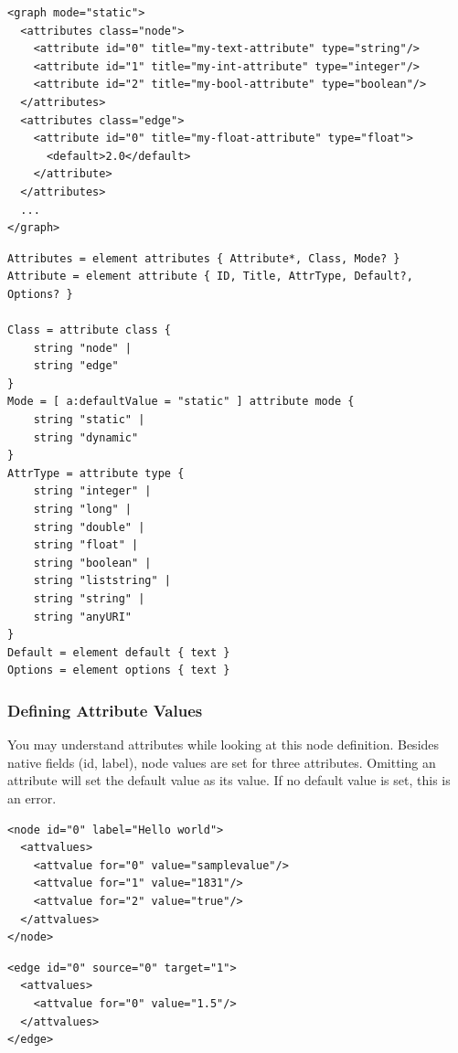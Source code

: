 \documentclass[a4paper,10pt]{article}
\begin{document}
\lstset{ style=gexf }
\begin{lstlisting}[caption={Attributes Definition},label=attributesDef]
<graph mode="static">
  <attributes class="node">
    <attribute id="0" title="my-text-attribute" type="string"/>
    <attribute id="1" title="my-int-attribute" type="integer"/>
    <attribute id="2" title="my-bool-attribute" type="boolean"/>
  </attributes>
  <attributes class="edge">
    <attribute id="0" title="my-float-attribute" type="float">
      <default>2.0</default>
    </attribute>
  </attributes>
  ...
</graph>
\end{lstlisting}

\lstset{ style=rnc }
\begin{lstlisting}[caption={Attributes Specification},label=attributesRNC]
Attributes = element attributes { Attribute*, Class, Mode? }
Attribute = element attribute { ID, Title, AttrType, Default?, Options? }

Class = attribute class {
    string "node" |
    string "edge"
}
Mode = [ a:defaultValue = "static" ] attribute mode {
    string "static" |
    string "dynamic"
}
AttrType = attribute type {
    string "integer" |
    string "long" |
    string "double" |
    string "float" |
    string "boolean" |
    string "liststring" |
    string "string" |
    string "anyURI"
}
Default = element default { text }
Options = element options { text }
\end{lstlisting}

\subsubsection{Defining Attribute Values}

You may understand attributes while looking at this node definition. Besides native fields (id, label), node values are set for three attributes. Omitting an attribute will set the default value as its value. If no default value is set, this is an error.

\lstset{ style=gexf }
\begin{lstlisting}[caption={Node Attributes},label=nodeattributes]
<node id="0" label="Hello world">
  <attvalues>
    <attvalue for="0" value="samplevalue"/>
    <attvalue for="1" value="1831"/>
    <attvalue for="2" value="true"/>
  </attvalues>
</node>
\end{lstlisting}

\lstset{ style=gexf }
\begin{lstlisting}[caption={Edge Attributes},label=edgeattributes]
<edge id="0" source="0" target="1">
  <attvalues>
    <attvalue for="0" value="1.5"/>
  </attvalues>
</edge>
\end{lstlisting}
\end{document}
